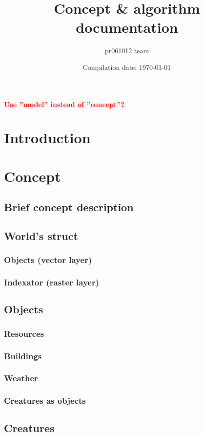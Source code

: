 \documentclass[12pt]{article}
\title{Concept \& algorithm documentation}
\author{pr061012 team}
\date{Compilation date: \today}
\newcommand{\todo}[1]
{
    \marginpar
    {
        \textbf{\small{\textcolor{red}{#1}}}
    }
}
\begin{document}
    \maketitle

    \todo{Use ''model'' instead of ''concept''?}

    \section*{Introduction}

    \section{Concept}
        \subsection{Brief concept description}
        \subsection{World's struct}
            \subsubsection{Objects (vector layer)}
            \subsubsection{Indexator (raster layer)}
        \subsection{Objects}
            \subsubsection{Resources}
            \subsubsection{Buildings}
            \subsubsection{Weather}
            \subsubsection{Creatures as objects}
        \subsection{Creatures}
\end{document}
